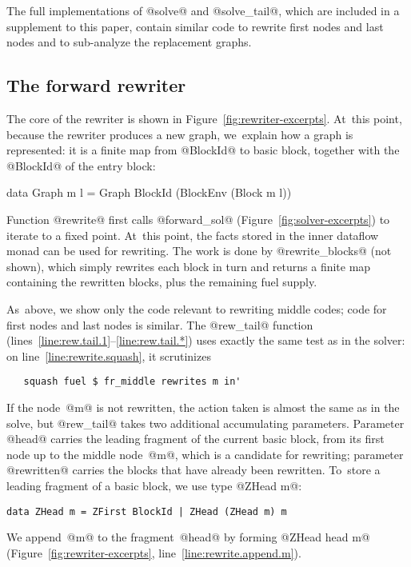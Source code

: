 \documentclass[blockstyle,preprint,nocopyrightspace]{sigplanconf}
\newcommand\lineref[1]{line~\ref{line:#1}}
\newcommand\linerangeref[2]{\mbox{lines~\ref{line:#1}--\ref{line:#2}}}
\newcommand\seclabel[1]{\label{sec:#1}}
\newcommand\figref[1]{Figure~\ref{fig:#1}}
\begin{document}
The full implementations of @solve@ and @solve_tail@, which are
included in a supplement to this paper, contain similar code to
rewrite first nodes and last nodes and to sub-analyze the replacement
graphs. 





\subsection{The forward rewriter}

\seclabel{forward-rewriter}

The core of the rewriter is shown in \figref{rewriter-excerpts}.
At~this point, because the rewriter produces a new graph, we~explain
how a graph is represented: it is a finite map from  @BlockId@
  to basic block, together with the @BlockId@ of the entry block:
\begin{code}
data Graph m l = Graph BlockId (BlockEnv (Block m l))
\end{code}
Function @rewrite@ first calls @forward_sol@
(\figref{solver-excerpts}) to iterate to a fixed point.
At~this point, the facts stored in the inner dataflow monad can be
used for rewriting.
The work is done by @rewrite_blocks@ (not shown), which simply
rewrites each block in turn and returns a finite map containing the
rewritten blocks, plus the remaining fuel supply.

As~above, we show only the code relevant to rewriting middle codes;
code for first nodes and last nodes is similar.
The @rew_tail@ function (\linerangeref{rew.tail.1}{rew.tail.*}) uses
exactly the same test as in the solver: on \lineref{rewrite.squash},
it scrutinizes
\begin{verbatim}
   squash fuel $ fr_middle rewrites m in'
\end{verbatim}
If the node~@m@ is not rewritten, the action taken is almost the same
as in the solve, but @rew_tail@ takes two 
 additional accumulating parameters.
Parameter @head@ carries
the leading fragment of the current basic block,
from its first node up to the middle node~@m@, which is
a candidate for rewriting;
parameter @rewritten@ carries the blocks that have already been
rewritten.
%
To~store a leading fragment of a basic block, we use type @ZHead m@:
\begin{verbatim} 
data ZHead m = ZFirst BlockId | ZHead (ZHead m) m
\end{verbatim}
We append~@m@ to the
fragment~@head@ by forming @ZHead head m@ 
(\figref{rewriter-excerpts}, \lineref{rewrite.append.m}). 
\end{document}
